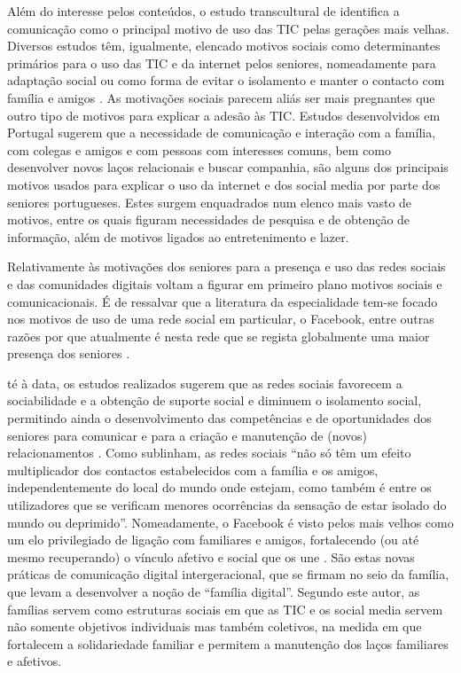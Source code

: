 \documentclass[portuguese]{textolivre}
\begin{document}
Além do interesse pelos conteúdos, o estudo transcultural de \textcite{ferreira2019} identifica a comunicação como o principal motivo de uso das TIC pelas gerações mais velhas. Diversos estudos têm, igualmente, elencado motivos sociais como determinantes primários para o uso das TIC e da internet pelos seniores, nomeadamente para adaptação social ou como forma de evitar o isolamento e manter o contacto com família e amigos \cite{juznic2006}. As motivações sociais parecem aliás ser mais pregnantes que outro tipo de motivos para explicar a adesão às TIC. Estudos desenvolvidos em Portugal sugerem que a necessidade de comunicação e interação com a família, com colegas e amigos e com pessoas com interesses comuns, bem como desenvolver novos laços relacionais e buscar companhia, são alguns dos principais motivos usados para explicar o uso da internet \cite{dias2012} e dos social media \cite{gama2020, miranda2020} por parte dos seniores portugueses. Estes surgem enquadrados num elenco mais vasto de motivos, entre os quais figuram necessidades de pesquisa e de obtenção de informação, além de motivos ligados ao entretenimento e lazer.

Relativamente às motivações dos seniores para a presença e uso das redes sociais e das comunidades digitais voltam a figurar em primeiro plano motivos sociais e comunicacionais. É de ressalvar que a literatura da especialidade tem-se focado nos motivos de uso de uma rede social em particular, o Facebook, entre outras razões por que atualmente é nesta rede que se regista globalmente uma maior presença dos seniores \cite{statista2020}.

té à data, os estudos realizados sugerem que as redes sociais favorecem a sociabilidade e a obtenção de suporte social e diminuem o isolamento social, permitindo ainda o desenvolvimento das competências e de oportunidades dos seniores para comunicar e para a criação e manutenção de (novos) relacionamentos \cite{hutto2015, coto2017}. Como \textcite[p. 179]{cardoso2005} sublinham, as redes sociais “não só têm um efeito multiplicador dos contactos estabelecidos com a família e os amigos, independentemente do local do mundo onde estejam, como também é entre os utilizadores que se verificam menores ocorrências da sensação de estar isolado do mundo ou deprimido”. Nomeadamente, o Facebook é visto pelos mais velhos como um elo privilegiado de ligação com familiares e amigos, fortalecendo (ou até mesmo recuperando) o vínculo afetivo e social que os une \cite{erickson2011, jung2001, miranda2020}. São estas novas práticas de comunicação digital intergeracional, que se firmam no seio da família, que levam \textcite{taipale2019} a desenvolver a noção de “família digital”. Segundo este autor, as famílias servem como estruturas sociais em que as TIC e os social media servem não somente objetivos individuais mas também coletivos, na medida em que fortalecem a solidariedade familiar e permitem a manutenção dos laços familiares e afetivos.
\end{document}
